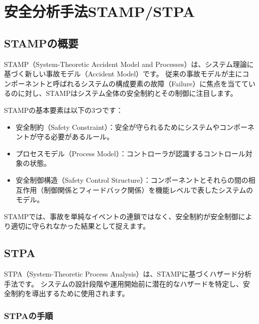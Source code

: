 \chapter{安全分析手法STAMP/STPA}
\label{chap3}

\section{STAMPの概要}

STAMP（System-Theoretic Accident Model and Processes）は、システム理論に基づく新しい事故モデル（Accident Model）です。
従来の事故モデルが主にコンポーネントと呼ばれるシステムの構成要素の故障（Failure）に焦点を当てているのに対し、STAMPはシステム全体の安全制約とその制御に注目します。


STAMPの基本要素は以下の3つです： %
%
\begin{itemize}
    \item 安全制約（Safety Constraint）：安全が守られるためにシステムやコンポーネントが守る必要があるルール。
    \item プロセスモデル（Process Model）：コントローラが認識するコントロール対象の状態。
    \item 安全制御構造（Safety Control Structure）：コンポーネントとそれらの間の相互作用（制御関係とフィードバック関係）を機能レベルで表したシステムのモデル。
\end{itemize}
%
STAMPでは、事故を単純なイベントの連鎖ではなく、安全制約が安全制御により適切に守られなかった結果として捉えます。

\section{STPA}

STPA（System-Theoretic Process Analysis）は、STAMPに基づくハザード分析手法です。
システムの設計段階や運用開始前に潜在的なハザードを特定し、安全制約を導出するために使用されます。

\subsection{STPAの手順}

